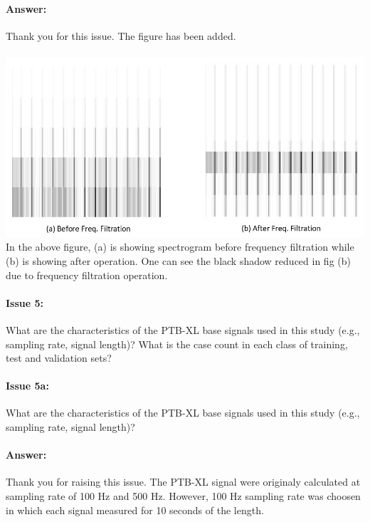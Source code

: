 \documentclass{article}
\begin{document}
\paragraph{Answer:}
Thank you for this issue. The figure has been added.\\\\
\includegraphics[scale=0.5]{before and after spectrogram.JPG}\\
In the above figure, (a) is showing spectrogram before frequency filtration while (b) is showing after operation. One can see the black shadow reduced in fig (b) due to frequency filtration operation. 

\paragraph{Issue 5:}
\begin{displayquote}
What are the characteristics of the PTB-XL base signals used in this study (e.g., sampling rate, signal length)? What is the case count in each class of training, test and validation sets?
\end{displayquote}

\paragraph{Issue 5a:}
\begin{displayquote}
What are the characteristics of the PTB-XL base signals used in this study (e.g., sampling rate, signal length)? 
\end{displayquote}

\paragraph{Answer:}
Thank you for raising this issue. The PTB-XL signal were originaly calculated at sampling rate of 100 Hz and 500 Hz. However, 100 Hz sampling rate was choosen in which each signal measured for 10 seconds of the length. 
\end{document}
